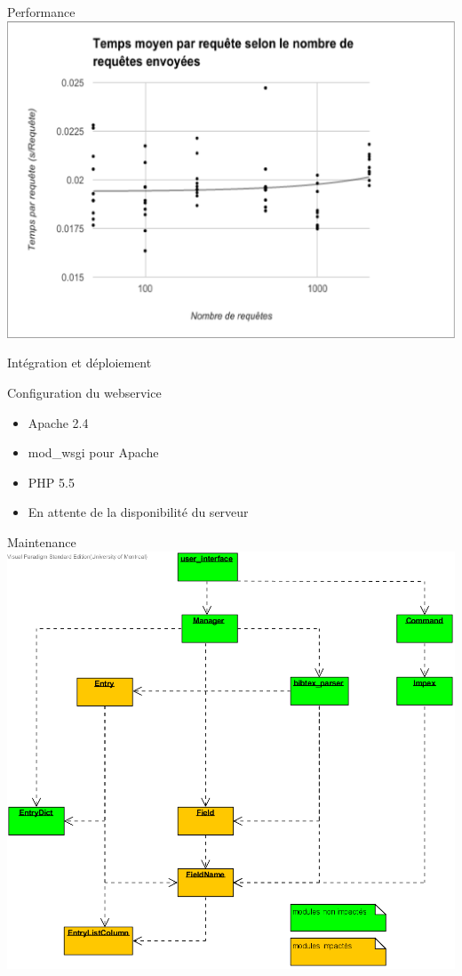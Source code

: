 \documentclass{beamer}
\begin{document}
\begin{frame}{Performance}
\includegraphics[width=\linewidth,height=\textheight,keepaspectratio]{tempsparequeteparrequete.pdf}
\end{frame}

\begin{frame}{Intégration et déploiement}

\begin{block}{Configuration du webservice} 
\begin{itemize}
  \item Apache 2.4
  \item mod\_wsgi pour Apache
  \item PHP 5.5
  \item En attente de la disponibilité du serveur
\end{itemize}
\end{block}

\end{frame}

\begin{frame}{Maintenance}
\includegraphics[width=\linewidth,height=0.8\textheight,keepaspectratio]{impact.png} 
\end{frame}
\end{document}
